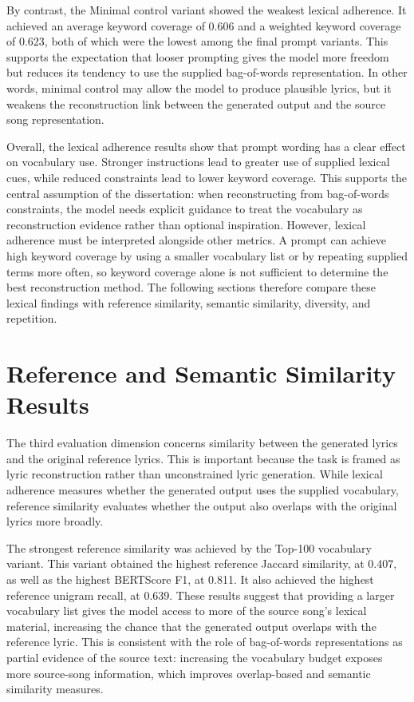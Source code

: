 By contrast, the Minimal control variant showed the weakest lexical adherence. It achieved an average keyword coverage of 0.606 and a weighted keyword coverage of 0.623, both of which were the lowest among the final prompt variants. This supports the expectation that looser prompting gives the model more freedom but reduces its tendency to use the supplied bag-of-words representation. In other words, minimal control may allow the model to produce plausible lyrics, but it weakens the reconstruction link between the generated output and the source song representation.

Overall, the lexical adherence results show that prompt wording has a clear effect on vocabulary use. Stronger instructions lead to greater use of supplied lexical cues, while reduced constraints lead to lower keyword coverage. This supports the central assumption of the dissertation: when reconstructing from bag-of-words constraints, the model needs explicit guidance to treat the vocabulary as reconstruction evidence rather than optional inspiration. However, lexical adherence must be interpreted alongside other metrics. A prompt can achieve high keyword coverage by using a smaller vocabulary list or by repeating supplied terms more often, so keyword coverage alone is not sufficient to determine the best reconstruction method. The following sections therefore compare these lexical findings with reference similarity, semantic similarity, diversity, and repetition.


\section{Reference and Semantic Similarity Results}

The third evaluation dimension concerns similarity between the generated lyrics and the original reference lyrics. This is important because the task is framed as lyric reconstruction rather than unconstrained lyric generation. While lexical adherence measures whether the generated output uses the supplied vocabulary, reference similarity evaluates whether the output also overlaps with the original lyrics more broadly.

The strongest reference similarity was achieved by the Top-100 vocabulary variant. This variant obtained the highest reference Jaccard similarity, at 0.407, as well as the highest BERTScore F1, at 0.811. It also achieved the highest reference unigram recall, at 0.639. These results suggest that providing a larger vocabulary list gives the model access to more of the source song's lexical material, increasing the chance that the generated output overlaps with the reference lyric. This is consistent with the role of bag-of-words representations as partial evidence of the source text: increasing the vocabulary budget exposes more source-song information, which improves overlap-based and semantic similarity measures.

